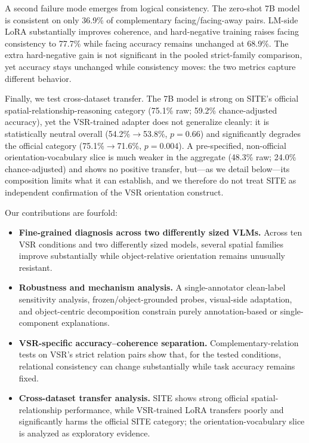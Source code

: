 A second failure mode emerges from logical consistency. The zero-shot 7B model is consistent on only 36.9\% of complementary facing/facing-away pairs. LM-side LoRA substantially improves coherence, and hard-negative training raises facing consistency to 77.7\% while facing accuracy remains unchanged at 68.9\%. The extra hard-negative gain is not significant in the pooled strict-family comparison, yet accuracy stays unchanged while consistency moves: the two metrics capture different behavior.

Finally, we test cross-dataset transfer. The 7B model is strong on SITE's official spatial-relationship-reasoning category (75.1\% raw; 59.2\% chance-adjusted accuracy), yet the VSR-trained adapter does not generalize cleanly: it is statistically neutral overall (54.2\%$\rightarrow$53.8\%, $p=0.66$) and significantly degrades the official category (75.1\%$\rightarrow$71.6\%, $p=0.004$). A pre-specified, non-official orientation-vocabulary slice is much weaker in the aggregate (48.3\% raw; 24.0\% chance-adjusted) and shows no positive transfer, but---as we detail below---its composition limits what it can establish, and we therefore do not treat SITE as independent confirmation of the VSR orientation construct.

Our contributions are fourfold:
\begin{itemize}[leftmargin=*]
    \item \textbf{Fine-grained diagnosis across two differently sized VLMs.} Across ten VSR conditions and two differently sized models, several spatial families improve substantially while object-relative orientation remains unusually resistant.
    \item \textbf{Robustness and mechanism analysis.} A single-annotator clean-label sensitivity analysis, frozen/object-grounded probes, visual-side adaptation, and object-centric decomposition constrain purely annotation-based or single-component explanations.
    \item \textbf{VSR-specific accuracy--coherence separation.} Complementary-relation tests on VSR's strict relation pairs show that, for the tested conditions, relational consistency can change substantially while task accuracy remains fixed.
    \item \textbf{Cross-dataset transfer analysis.} SITE shows strong official spatial-relationship performance, while VSR-trained LoRA transfers poorly and significantly harms the official SITE category; the orientation-vocabulary slice is analyzed as exploratory evidence.
\end{itemize}


